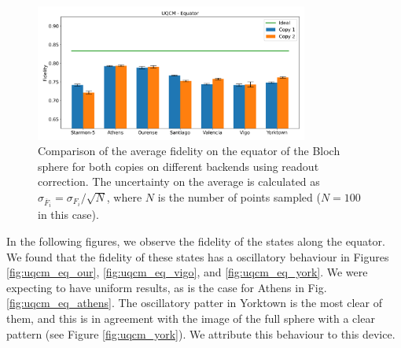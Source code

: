 \begin{figure}[H]
    \centering
            \includegraphics[width=0.8\textwidth]{Figures/UQCM/Histograms/histo_equator.png}
        
        \caption{Comparison of the average fidelity on the equator of the Bloch sphere for both copies on different backends using readout correction. The uncertainty on the average is calculated as $\sigma_{\overline{F}_i}=\sigma_{F_i}/\sqrt{N}$, where $N$ is the number of points sampled ($N=100$ in this case).}\label{fig:hist_uqcm_eq}
\end{figure} 

In the following figures, we observe the fidelity of the states along the equator. We found that the fidelity of these states has a oscillatory behaviour in Figures \ref{fig:uqcm_eq_our}, \ref{fig:uqcm_eq_vigo}, and \ref{fig:uqcm_eq_york}. We were expecting to have uniform results, as is the case for Athens in Fig. \ref{fig:uqcm_eq_athens}. The oscillatory patter in Yorktown is the most clear of them, and this is in agreement with the image of the full sphere with a clear pattern (see Figure \ref{fig:uqcm_york}). We attribute this behaviour to this device.  


